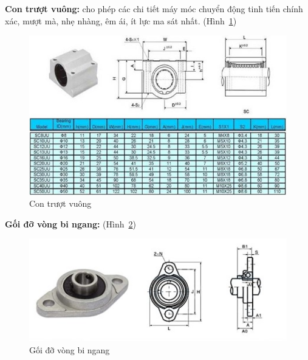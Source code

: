 \textbf{Con trượt vuông:} cho phép các chi tiết máy móc chuyển động tinh tiến chính xác, mượt mà, nhẹ nhàng, êm ái, ít lực ma sát nhất. (Hình~\ref{fig:contruotvuong})
\begin{center}
    \begin{figure}[htp]
    \begin{center}
     \includegraphics[scale=1]{Chapters/Chapter3/Images/Contruotvuong}
    \end{center}
    \caption{Con trượt vuông}
    \label{fig:contruotvuong}
    \end{figure}
\end{center}

\textbf{Gối đỡ vòng bi ngang:} (Hình~\ref{fig:goidovongbingang})

\begin{center}
    \begin{figure}[htp]
    \begin{center}
     \includegraphics[scale=1]{Chapters/Chapter3/Images/Goidovongbingang}
    \end{center}
    \caption{Gối đỡ vòng bi ngang}
    \label{fig:goidovongbingang}
    \end{figure}
\end{center}

